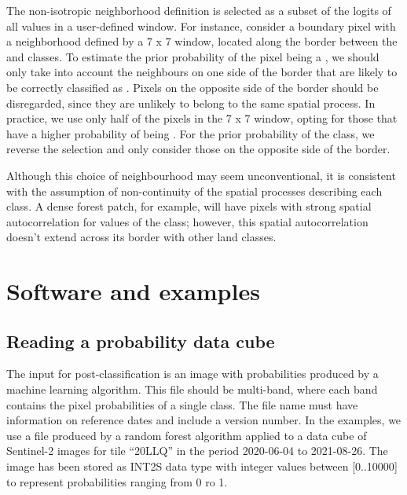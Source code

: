 \documentclass[
  shortnames]{jss}
\begin{document}
The non-isotropic neighborhood definition is selected as a subset of the logits of all values in a user-defined window. For instance, consider a boundary pixel with a neighborhood defined by a 7 x 7 window, located along the border between the  and  classes. To estimate the prior probability of the pixel being a , we should only take into account the neighbours on one side of the border that are likely to be correctly classified as . Pixels on the opposite side of the border should be disregarded, since they are unlikely to belong to the same spatial process. In practice, we use only half of the pixels in the 7 x 7 window, opting for those that have a higher probability of being . For the prior probability of the  class, we reverse the selection and only consider those on the opposite side of the border.

Although this choice of neighbourhood may seem unconventional, it is consistent with the assumption of non-continuity of the spatial processes describing each class. A dense forest patch, for example, will have pixels with strong spatial autocorrelation for values of the  class; however, this spatial autocorrelation doesn't extend across its border with other land classes.

\hypertarget{software-and-examples}{%
\section{Software and examples}\label{software-and-examples}}

\hypertarget{reading-a-probability-data-cube}{%
\subsection{Reading a probability data cube}\label{reading-a-probability-data-cube}}

The input for post-classification is an image with probabilities produced by a machine learning algorithm. This file should be multi-band, where each band contains the pixel probabilities of a single class. The file name must have information on reference dates and include a version number. In the examples, we use a file produced by a random forest algorithm applied to a data cube of Sentinel-2 images for tile ``20LLQ'' in the period 2020-06-04 to 2021-08-26. The image has been stored as INT2S data type with integer values between {[}0..10000{]} to represent probabilities ranging from 0 ro 1.
\end{document}
